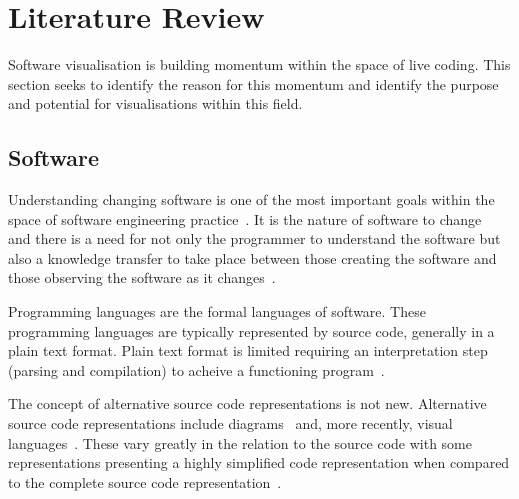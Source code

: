 
\chapter{Literature Review}

Software visualisation is building momentum within the space of live coding. This section seeks to identify the reason for this momentum and identify the purpose and potential for visualisations within this field.


\section{Software}

Understanding changing software is one of the most important goals within the space of software engineering practice~\cite{Tao2012}. It is the nature of software to change~\cite{Purushothaman2005} and there is a need for not only the programmer to understand the software but also a knowledge transfer to take place between those creating the software and those observing the software as it changes~.

Programming languages are the formal languages of software. These programming languages are typically represented by source code, generally in a plain text format. Plain text format is limited requiring an interpretation step (parsing and compilation) to acheive a functioning program~\cite{Badros2000}.

The concept of alternative source code representations is not new. Alternative source code representations include diagrams~ and, more recently, visual languages~. These vary greatly in the relation to the source code with some representations presenting a highly simplified code representation when compared to the complete source code representation~.

